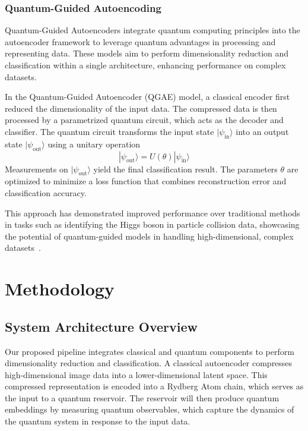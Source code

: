 \documentclass[conference]{IEEEtran}
\begin{document}
\subsubsection{Quantum-Guided Autoencoding}
Quantum-Guided Autoencoders integrate quantum 
computing principles into the autoencoder framework 
to leverage quantum advantages in processing and 
representing data. These models aim to perform 
dimensionality reduction and classification within a 
single architecture, enhancing performance on complex 
datasets.

In the Quantum-Guided Autoencoder (QGAE) model, a 
classical encoder first reduced the dimensionality
of the input data. The compressed data is then processed 
by a parametrized quantum circuit, which acts as the decoder
and classifier. The quantum circuit transforms the 
input state \( |\psi_{\text{in}}\rangle \) into an
output state \( |\psi_{\text{out}}\rangle \) using a unitary operation
\begin{equation}
    |\psi_{\text{out}}\rangle = U(\theta) |\psi_{\text{in}}\rangle
\end{equation}
Measurements on \( |\psi_{\text{out}}\rangle \) yield the final
classification result. The parameters \( \theta \) are
optimized to minimize a loss function that combines
reconstruction error and classification accuracy.


This approach has demonstrated improved performance 
over traditional methods in tasks such as identifying 
the Higgs boson in particle collision data, 
showcasing the potential of quantum-guided models in 
handling high-dimensional, complex datasets~\cite{belisGuidedQuantumCompression2024}.

\section{Methodology}
\subsection{System Architecture Overview}
Our proposed pipeline integrates classical and quantum 
components to perform dimensionality reduction and
classification. 
A classical autoencoder compresses
high-dimensional image data into a lower-dimensional
latent space. 
This compressed representation is 
encoded into a Rydberg Atom chain, which serves as 
the input to a quantum reservoir. 
The reservoir will then produce quantum embeddings
by measuring quantum observables, which capture the
dynamics of the quantum system in response to the input data.
\end{document}

